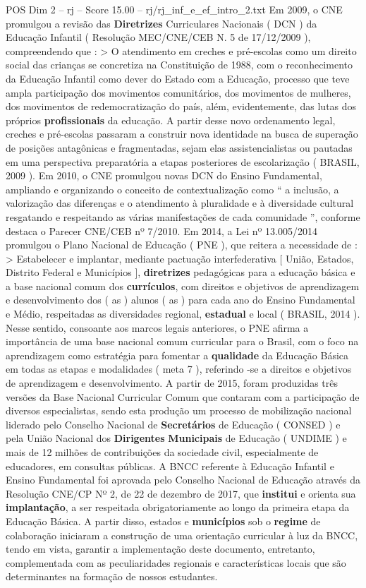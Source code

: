 \begin{textsample}{POS Dim 2 – rj – Score 15.00 – rj/rj\_inf\_e\_ef\_intro\_2.txt}
Em 2009, o CNE promulgou a revisão das \textbf{Diretrizes} Curriculares Nacionais ( DCN ) da Educação Infantil ( Resolução MEC/CNE/CEB N. 5 de 17/12/2009 ), compreendendo que : > O atendimento em creches e pré-escolas como um direito social das crianças se concretiza na Constituição de 1988, com o reconhecimento da Educação Infantil como dever do Estado com a Educação, processo que teve ampla participação dos movimentos comunitários, dos movimentos de mulheres, dos movimentos de redemocratização do país, além, evidentemente, das lutas dos próprios \textbf{profissionais} da educação.
A partir desse novo ordenamento legal, creches e pré-escolas passaram a construir nova identidade na busca de superação de posições antagônicas e fragmentadas, sejam elas assistencialistas ou pautadas em uma perspectiva preparatória a etapas posteriores de escolarização ( BRASIL, 2009 ).
Em 2010, o CNE promulgou novas DCN do Ensino Fundamental, ampliando e organizando o conceito de contextualização como “ a inclusão, a valorização das diferenças e o atendimento à pluralidade e à diversidade cultural resgatando e respeitando as várias manifestações de cada comunidade ”, conforme destaca o Parecer CNE/CEB nº 7/2010.
Em 2014, a Lei nº 13.005/2014 promulgou o Plano Nacional de Educação ( PNE ), que reitera a necessidade de : > Estabelecer e implantar, mediante pactuação interfederativa [ União, Estados, Distrito Federal e Municípios ], \textbf{diretrizes} pedagógicas para a educação básica e a base nacional comum dos \textbf{currículos}, com direitos e objetivos de aprendizagem e desenvolvimento dos ( as ) alunos ( as ) para cada ano do Ensino Fundamental e Médio, respeitadas as diversidades regional, \textbf{estadual} e local ( BRASIL, 2014 ).
Nesse sentido, consoante aos marcos legais anteriores, o PNE afirma a importância de uma base nacional comum curricular para o Brasil, com o foco na aprendizagem como estratégia para fomentar a \textbf{qualidade} da Educação Básica em todas as etapas e modalidades ( meta 7 ), referindo -se a direitos e objetivos de aprendizagem e desenvolvimento.
A partir de 2015, foram produzidas três versões da Base Nacional Curricular Comum que contaram com a participação de diversos especialistas, sendo esta produção um processo de mobilização nacional liderado pelo Conselho Nacional de \textbf{Secretários} de Educação ( CONSED ) e pela União Nacional dos \textbf{Dirigentes} \textbf{Municipais} de Educação ( UNDIME ) e mais de 12 milhões de contribuições da sociedade civil, especialmente de educadores, em consultas públicas.
A BNCC referente à Educação Infantil e Ensino Fundamental foi aprovada pelo Conselho Nacional de Educação através da Resolução CNE/CP Nº 2, de 22 de dezembro de 2017, que \textbf{institui} e orienta sua \textbf{implantação}, a ser respeitada obrigatoriamente ao longo da primeira etapa da Educação Básica.
A partir disso, estados e \textbf{municípios} sob o \textbf{regime} de colaboração iniciaram a construção de uma orientação curricular à luz da BNCC, tendo em vista, garantir a implementação deste documento, entretanto, complementada com as peculiaridades regionais e características locais que são determinantes na formação de nossos estudantes.


\end{textsample}
